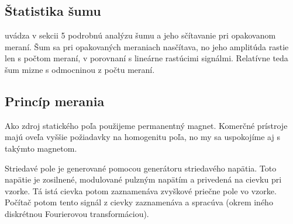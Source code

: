 \documentclass[a4paper, 10pt]{article}
\begin{document}
\subsection*{Štatistika šumu}
\cite{stud} uvádza v sekcii 5 podrobnú analýzu šumu a jeho sčítavanie pri opakovanom meraní. Šum sa pri opakovaných meraniach nasčítava, no jeho amplitúda rastie len s počtom meraní, v porovnaní s lineárne rastúcimi signálmi. Relatívne teda šum mizne s odmocninou z počtu meraní.

\subsection*{Princíp merania}
Ako zdroj statického poľa použijeme permanentný magnet. Komerčné prístroje majú oveľa vyššie požiadavky na homogenitu poľa, no my sa uspokojíme aj s takýmto magnetom.

Striedavé pole je generované pomocou generátoru striedavého napätia. Toto napätie je zosilnené, modulované pulzným napätím a privedená na cievku pri vzorke. Tá istá cievka potom zaznamenáva zvyškové priečne pole vo vzorke. Počítač potom tento signál z cievky zaznamenáva a spracúva (okrem iného diskrétnou Fourierovou transformáciou).

\end{document}
